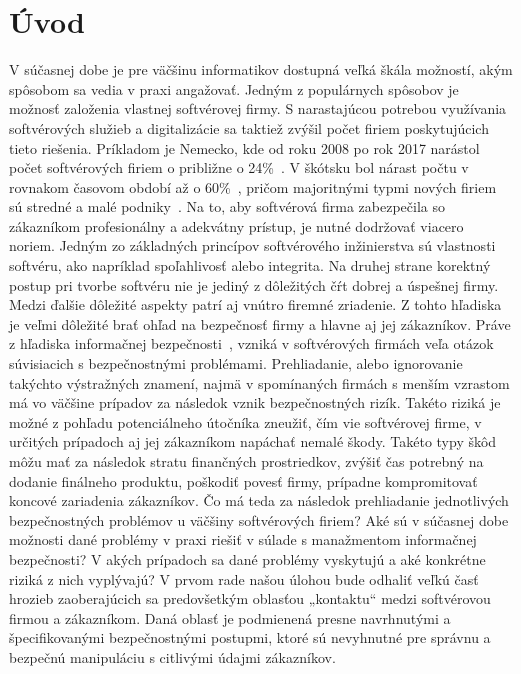 \chapter{Úvod}\label{ch:úvod}

V súčasnej dobe je pre väčšinu informatikov dostupná veľká škála možností, akým spôsobom sa vedia v praxi angažovať.
Jedným z populárnych spôsobov je možnosť založenia vlastnej softvérovej firmy.
S narastajúcou potrebou využívania softvérových služieb a digitalizácie sa taktiež zvýšil počet firiem poskytujúcich tieto riešenia.
Príkladom je Nemecko, kde od roku 2008 po rok 2017 narástol počet softvérových firiem o približne o 24\%~\cite{CompaniesGerman}.
V škótsku bol nárast počtu v rovnakom časovom období až o 60\%~\cite{SoftwareBusiness}, pričom majoritnými typmi nových
firiem sú stredné a malé podniky~\cite{CompaniesScotch}.
Na to, aby softvérová firma zabezpečila so zákazníkom profesionálny a adekvátny prístup, je nutné dodržovať viacero noriem.
Jedným zo základných princípov softvérového inžinierstva sú vlastnosti softvéru, ako napríklad spoľahlivosť alebo integrita.
Na druhej strane korektný postup pri tvorbe softvéru nie je jediný z dôležitých čŕt dobrej a úspešnej firmy.
Medzi ďalšie dôležité aspekty patrí aj vnútro firemné zriadenie.
Z tohto hľadiska je veľmi dôležité brať ohľad na bezpečnosť firmy a hlavne aj jej zákazníkov.
Práve z hľadiska informačnej bezpečnosti~\cite{IB}, vzniká v softvérových firmách veľa otázok súvisiacich s bezpečnostnými problémami.
Prehliadanie, alebo ignorovanie takýchto výstražných znamení, najmä v spomínaných firmách s menším vzrastom má vo väčšine
prípadov za následok vznik bezpečnostných rizík.
Takéto riziká je možné z pohľadu potenciálneho útočníka zneužiť, čím vie softvérovej firme, v určitých prípadoch aj jej
zákazníkom napáchať nemalé škody.
Takéto typy škôd môžu mať za následok stratu finančných prostriedkov, zvýšiť čas potrebný na dodanie finálneho
produktu, poškodiť povesť firmy, prípadne kompromitovať koncové zariadenia zákazníkov.
Čo má teda za následok prehliadanie jednotlivých bezpečnostných problémov u väčšiny softvérových firiem?
Aké sú v súčasnej dobe možnosti dané problémy v praxi riešiť v súlade s manažmentom informačnej bezpečnosti?
V akých prípadoch sa dané problémy vyskytujú a aké konkrétne riziká z nich vyplývajú?
V prvom rade našou úlohou bude odhaliť veľkú časť hrozieb zaoberajúcich sa predovšetkým oblasťou „kontaktu“ medzi softvérovou firmou a zákazníkom.
Daná oblasť je podmienená presne navrhnutými a špecifikovanými bezpečnostnými
postupmi, ktoré sú nevyhnutné pre správnu a bezpečnú manipuláciu s citlivými údajmi zákazníkov.
